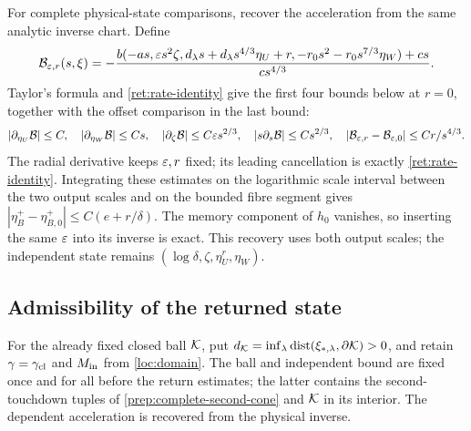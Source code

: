 For complete physical-state comparisons, recover the acceleration
from the same analytic inverse chart. Define
\[
 \mathcal B_{\varepsilon,r}(s,\xi)=
 -\frac{b(-as,\varepsilon s^2\zeta,d_\lambda s+d_\lambda s^{4/3}\eta_U+r,
                 -r_0s^2-r_0s^{7/3}\eta_W)+cs}{cs^{4/3}}.
\]
Taylor's formula and \eqref{ret:rate-identity} give the first four
bounds below at $r=0$, together with the offset comparison in the
last bound:
\begin{equation}
 |\partial_{\eta_U}\mathcal B|\le C,\quad
 |\partial_{\eta_W}\mathcal B|\le Cs,\quad
 |\partial_\zeta\mathcal B|\le C\varepsilon s^{2/3},\quad
 |s\partial_s\mathcal B|\le Cs^{2/3},\quad
 |\mathcal B_{\varepsilon,r}-\mathcal B_{\varepsilon,0}|\le Cr/s^{4/3}.
 \label{ret:dependent-Lipschitz}
\end{equation}
The radial derivative keeps $\varepsilon,r$ fixed; its leading cancellation
is exactly \eqref{ret:rate-identity}. Integrating these estimates on
the logarithmic scale interval between the two output scales and on
the bounded fibre segment gives
$|\eta_B^+-\eta_{B,0}^+|\le C(e+r/\delta)$.
The memory component of $h_0$ vanishes, so inserting the same
$\varepsilon$ into its inverse is exact. This recovery uses both output scales; the
independent state remains $(\log\delta,\zeta,\eta_U^r,\eta_W)$.

\subsection{Admissibility of the returned state}
\label{sec:detuned-output-admission}

For the already fixed closed ball $\mathcal K$, put
$d_\mathcal K=\inf_\lambda\operatorname{dist}
(\xi_{*,\lambda},\partial\mathcal K)>0$, and retain
$\gamma=\gamma_{\rm cl}$ and $M_{\rm in}$ from \eqref{loc:domain}.
The ball and independent bound are fixed once and for all before
the return estimates; the latter contains the second-touchdown tuples
of \eqref{prep:complete-second-cone} and $\mathcal K$ in its interior.
The dependent acceleration is recovered from the physical inverse.

